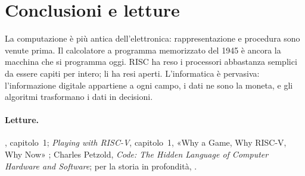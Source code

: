 \section{Conclusioni e letture}

La computazione è più antica dell'elettronica: rappresentazione e procedura
sono venute prima. Il calcolatore a programma memorizzato del 1945 è ancora la
macchina che si programma oggi. RISC ha reso i processori abbastanza semplici
da essere capiti per intero; \riscv li ha resi aperti. L'informatica è
pervasiva: l'informazione digitale appartiene a ogni campo, i dati ne sono la
moneta, e gli algoritmi trasformano i dati in decisioni.

\paragraph{Letture.} \citet{patterson2020}, capitolo~1; \emph{Playing with
RISC-V}, capitolo~1, «Why a Game, Why RISC-V, Why Now»
\citep{prg32textbook}; Charles Petzold, \emph{Code: The Hidden Language of
Computer Hardware and Software}; per la storia in profondità,
\citet{ceruzzi2003}.